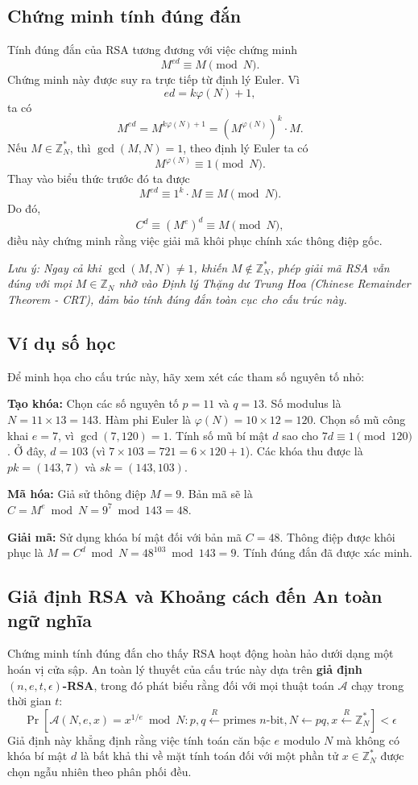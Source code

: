\subsection{Chứng minh tính đúng đắn}

Tính đúng đắn của RSA tương đương với việc chứng minh
\[
M^{ed} \equiv M \pmod{N}.
\]
Chứng minh này được suy ra trực tiếp từ định lý Euler. Vì
\[
ed = k\varphi(N)+1,
\]
ta có
\[
M^{ed} = M^{k\varphi(N)+1} = \left(M^{\varphi(N)}\right)^k \cdot M.
\]
Nếu $M \in \mathbb{Z}_N^{\ast}$, thì $\gcd(M,N)=1$, theo định lý Euler ta có
\[
M^{\varphi(N)} \equiv 1 \pmod{N}.
\]
Thay vào biểu thức trước đó ta được
\[
M^{ed} \equiv 1^k \cdot M \equiv M \pmod{N}.
\]
Do đó,
\[
C^d \equiv (M^e)^d \equiv M \pmod{N},
\]
điều này chứng minh rằng việc giải mã khôi phục chính xác thông điệp gốc.

\textit{Lưu ý: Ngay cả khi $\gcd(M, N) \neq 1$, khiến $M \notin \mathbb{Z}_N^{\ast}$, phép giải mã RSA vẫn đúng với mọi $M \in \mathbb{Z}_N$ nhờ vào Định lý Thặng dư Trung Hoa (Chinese Remainder Theorem - CRT), đảm bảo tính đúng đắn toàn cục cho cấu trúc này.}

\subsection{Ví dụ số học}

Để minh họa cho cấu trúc này, hãy xem xét các tham số nguyên tố nhỏ:

\textbf{Tạo khóa:} Chọn các số nguyên tố $p = 11$ và $q = 13$. Số modulus là $N = 11 \times 13 = 143$. Hàm phi Euler là $\varphi(N) = 10 \times 12 = 120$. Chọn số mũ công khai $e = 7$, vì $\gcd(7, 120) = 1$. Tính số mũ bí mật $d$ sao cho $7d \equiv 1 \pmod{120}$. Ở đây, $d = 103$ (vì $7 \times 103 = 721 = 6 \times 120 + 1$). Các khóa thu được là $pk = (143, 7)$ và $sk = (143, 103)$.

\textbf{Mã hóa:} Giả sử thông điệp $M = 9$. Bản mã sẽ là $C = M^e \bmod N = 9^7 \bmod 143 = 48$.

\textbf{Giải mã:} Sử dụng khóa bí mật đối với bản mã $C = 48$. Thông điệp được khôi phục là $M = C^d \bmod N = 48^{103} \bmod 143 = 9$. Tính đúng đắn đã được xác minh.

\subsection{Giả định RSA và Khoảng cách đến An toàn ngữ nghĩa}

Chứng minh tính đúng đắn cho thấy RSA hoạt động hoàn hảo dưới dạng một hoán vị cửa sập. An toàn lý thuyết của cấu trúc này dựa trên \textbf{giả định $(n, e, t, \epsilon)$-RSA}, trong đó phát biểu rằng đối với mọi thuật toán $\mathcal{A}$ chạy trong thời gian $t$:
\[
\Pr \left[ \mathcal{A}(N, e, x) = x^{1/e} \bmod N : p, q \xleftarrow{R} \text{primes } n\text{-bit}, N \leftarrow pq, x \xleftarrow{R} \mathbb{Z}_N^{\ast} \right] < \epsilon
\]
Giả định này khẳng định rằng việc tính toán căn bậc $e$ modulo $N$ mà không có khóa bí mật $d$ là bất khả thi về mặt tính toán đối với một phần tử $x \in \mathbb{Z}_N^{\ast}$ được chọn ngẫu nhiên theo phân phối đều.

